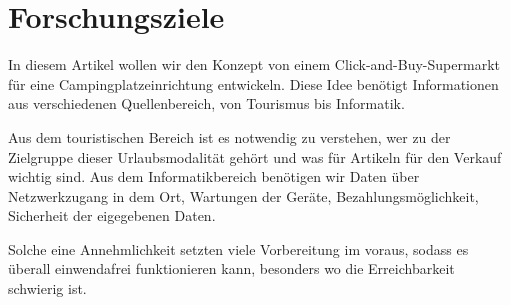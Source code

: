 \section{Forschungsziele}

In diesem Artikel wollen wir den Konzept von einem Click-and-Buy-Supermarkt für eine
Campingplatzeinrichtung entwickeln. Diese Idee benötigt Informationen aus verschiedenen
Quellenbereich, von Tourismus bis Informatik. 


Aus dem touristischen Bereich ist es notwendig zu verstehen, wer zu der Zielgruppe
dieser Urlaubsmodalität gehört und was für Artikeln für den Verkauf wichtig sind. 
Aus dem Informatikbereich benötigen wir Daten über  Netzwerkzugang in dem Ort, 
Wartungen der Geräte, Bezahlungsmöglichkeit, Sicherheit der eigegebenen Daten.


Solche eine Annehmlichkeit setzten viele Vorbereitung im voraus, sodass es überall
einwendafrei funktionieren kann, besonders wo die Erreichbarkeit schwierig ist. 